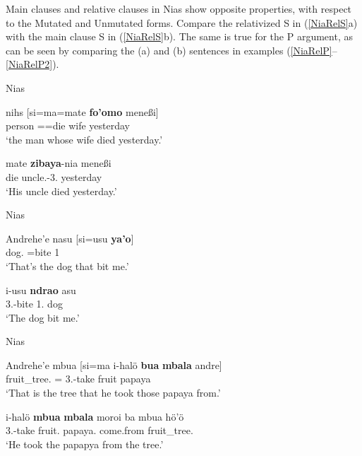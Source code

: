 
Main clauses and relative clauses in Nias show opposite properties, with respect to the Mutated and Unmutated forms.
Compare the relativized S in (\ref{NiaRelS}a) with the main clause S in (\ref{NiaRelS}b). 
The same is true for the P argument, as can be seen by comparing the (a) and (b) sentences in examples (\ref{NiaRelP}--\ref{NiaRelP2}). 

\begin{exe} \ex\label{NiaRelS} {Nias} \citetext{Sundic; Indonesia; \citealt[414, 559]{Brown:2001}}\nopagebreak[4]
\begin{xlist}
\ex \gll nihs  {\rm[}si=ma=mate \textbf{fo'omo} mene{\ss}i{\rm]}\\
person \relativ{}=\compl{}=die wife yesterday\\
`the man whose wife died yesterday.'

 \ex \gll mate \textbf{zibaya}-nia mene{\ss}i\\
die uncle.\mut{}-3\sg{}.\poss{} yesterday\\
`His uncle died yesterday.' %
\end{xlist} 
\end{exe}

\begin{exe} \ex\label{NiaRelP} {Nias} \citetext{\citealt[414]{Brown:2001}}\nopagebreak[4]
\begin{xlist} 
\ex \gll Andrehe'e {nasu}  {\rm[}si=usu \textbf{ya'o}{\rm]}\\
\dist{} dog.\mut{} \relativ{}=bite 1\sg{}\\
`That's the dog that bit me.'  %

\ex \gll i-usu \textbf{ndrao} {asu}\\
3\sg{}.\rls{}-bite 1\sg{}.\mut{} dog\\
`The dog bit me.' %
\end{xlist}%
\end{exe} 

\pagebreak
\begin{exe} \ex\label{NiaRelP2} {Nias} \citetext{\citealt[415]{Brown:2001}}\nopagebreak[4]
\begin{xlist}
\ex \gll Andrehe'e mbua  {\rm[}si=ma i-hal\"o \textbf{bua} \textbf{mbala} {andre}{\rm]}\\
\dist{} fruit\_tree.\mut{} \relativ{}=\pfv{} 3\sg{}.\rls{}-take fruit papaya \dist{}\\
`That is the tree that he took those papaya from.' %

\ex \gll i-hal\"o \textbf{mbua} \textbf{mbala} moroi ba mbua h\"o'\"o\\
3\sg{}.\rls{}-take fruit.\mut{} papaya.\mut{} come.from \loc{} fruit\_tree.\mut{} \dist{}\\
`He took the papapya from the tree.'
\end{xlist}%
\end{exe} 

